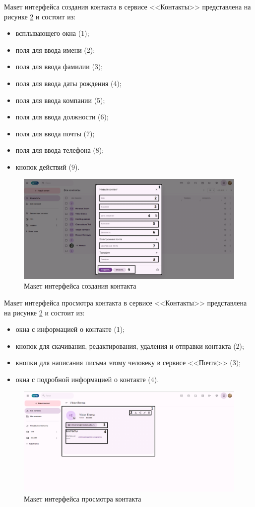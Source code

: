 Макет интерфейса создания контакта в сервисе <<Контакты>> представлена на рисунке \ref{templ:image5b} и состоит из:
\begin{itemize}
  \item всплывающего окна (1);
  \item поля для ввода имени (2);
  \item поля для ввода фамилии (3);
  \item поля для ввода даты рождения (4);
  \item поля для ввода компании (5);
  \item поля для ввода должности (6);
  \item поля для ввода почты (7);
  \item поля для ввода телефона (8);
  \item кнопок действий (9).
\end{itemize}
\begin{figure}[H]
	\centering
	\includegraphics[width=1\linewidth]{images/контакты2}
	\caption{Макет интерфейса создания контакта}
	\label{templ:image5b}
\end{figure}

Макет интерфейса просмотра контакта в сервисе <<Контакты>> представлена на рисунке \ref{templ:image5b} и состоит из:
\begin{itemize}
  \item окна с информацией о контакте (1);
  \item кнопок для скачивания, редактирования, удаления и отправки контакта (2);
  \item кнопки для написания письма этому человеку в сервисе <<Почта>> (3);
  \item окна с подробной информацией о контакте (4).
\end{itemize}
\begin{figure}[H]
	\centering
	\includegraphics[width=1\linewidth]{images/контакты3}
	\caption{Макет интерфейса просмотра контакта}
	\label{templ:image5b}
\end{figure}

